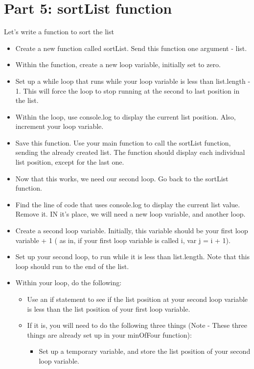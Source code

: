\documentclass{article}
\begin{document}
\section*{Part 5: sortList function}
Let's write a function to sort the list
\begin{itemize}
    \item Create a new function called sortList.  Send this function one argument - list.
    \item Within the function, create a new loop variable, initially set to zero.
    \item Set up a while loop that runs while your loop variable is less than list.length - 1.  This will force the loop to stop running at the second to last position in the list.
    \item Within the loop, use console.log to display the current list position.  Also, increment your loop variable.
    \item Save this function.  Use your main function to call the sortList function, sending the already created list.  The function should display each individual list position, except for the last one.
    \item Now that this works, we need our second loop.  Go back to the sortList function.
    \item Find the line of code that uses console.log to display the current list value.  Remove it.  IN it's place, we will need a new loop variable, and another loop.
    \item Create a second loop variable.  Initially, this variable should be your first loop variable + 1 ( as in, if your first loop variable is called i, var j = i + 1).
    \item Set up your second loop, to run while it is less than list.length.  Note that this loop should run to the end of the list.
    \item Within your loop, do the following:
    \begin{itemize}
    		\item Use an if statement to see if the list position at your second loop variable is less than the list position of your first loop variable.
    		\item If it is, you will need to do the following three things (Note - These three things are already set up in your minOfFour function):
    		\begin{itemize}
    			\item Set up a temporary variable, and store the list position of your second loop variable.

\end{itemize}
\end{itemize}
\end{itemize}
\end{document}
